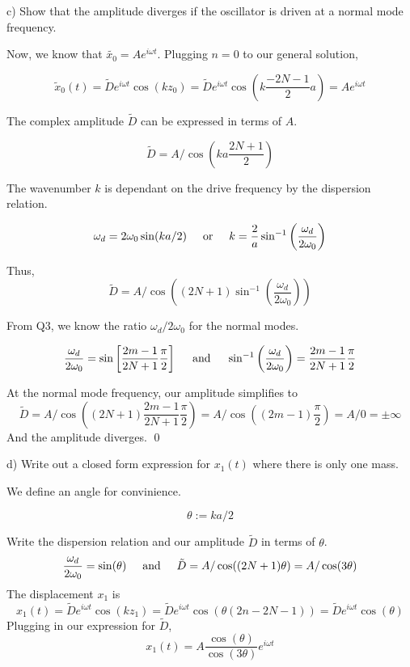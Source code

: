 \documentclass{article}
\newcommand{\textOr}{
    {
        \hspace{5mm}
        \textrm{or}
        \hspace{5mm}
    }
}
\newcommand{\textAnd}{
    {
        \hspace{5mm}
        \textrm{and}
        \hspace{5mm}
    }
}
\newcommand{\Ixp}[1]{
    {
        e^{i{#1}}
    }
}
\begin{document}
c) Show that the amplitude diverges if the oscillator 
is driven at a normal mode frequency. 

Now, we know that $\tilde{x_0} = A\Ixp{\omega t}$. Plugging $n = 0$
to our general solution, 

\[
    \tilde{x}_0(t) = \tilde{D}\Ixp{\omega t} \cos(kz_0)
    = \tilde{D}\Ixp{\omega t} \cos(k\frac{- 2N - 1}{2}a) = 
    A\Ixp{\omega t}
\]

The complex amplitude $\tilde{D}$ can be expressed in terms of $A$. 

\[
    \tilde{D} = A / \cos(ka \frac{2N + 1}{2})
\]

The wavenumber $k$ is dependant on the drive frequency by the dispersion 
relation. 

\[
    \omega_d = 2\omega_0 \sin(ka / 2)
    \textOr 
    k = 
    \frac{2}{a}
    \sin^{-1}\left(
        \frac{\omega_d}{2\omega_0}
    \right)
\]

Thus, 
\[
    \tilde{D} = A / \cos\left(
        (2N + 1)\sin^{-1}\left(\frac{\omega_d}{2\omega_0}
        \right)
    \right)
\]

From Q3, we know the ratio $\omega_d / 2\omega_0$ 
for the normal modes. 

\[
    \frac{\omega_d}{2\omega_0} = \sin \left[
        \frac{2m - 1}{2N + 1}
        \frac{\pi}{2}
    \right]
    \textAnd 
    \sin^{-1} \left(
        \frac{\omega_d}{2\omega_0}
    \right)
    = 
    \frac{2m - 1} {2N + 1}\frac{\pi}{2}
\]

At the normal mode frequency, our amplitude simplifies to 
\[
    \tilde{D} = A / \cos\left(
        (2N + 1)
\frac{2m - 1} {2N + 1}\frac{\pi}{2}
    \right)
    = A/\cos\left(
        (2m - 1)\frac{\pi}{2}
    \right) = A/0 = \pm\infty
\]
And the amplitude diverges. \hfill \qed

d) Write out a closed form expression for $x_1(t)$ where there is 
only one mass. 

We define an angle for convinience. 

\[
   \theta := ka/2 
\]

Write the dispersion relation and our amplitude $\tilde{D}$ 
in terms of $\theta$.
\[
    \frac{\omega_d}{2\omega_0} = \sin(\theta)
    \textAnd 
    \tilde{D} = A/\cos((2N+1)\theta) = A/\cos(3\theta)
\]
The displacement $x_1$ is 
\[
    x_1(t) = \tilde{D}\Ixp{\omega t} \cos(k z_1)
    = \tilde{D}\Ixp{\omega t} \cos (\theta (2n - 2N - 1))
    = \tilde{D}\Ixp{\omega t} \cos(\theta)
\]
Plugging in our expression for $\tilde{D}$, 
\[
    x_1(t) = A \frac{\cos(\theta)}{\cos(3\theta)}\Ixp{\omega t}
\]
\end{document}
